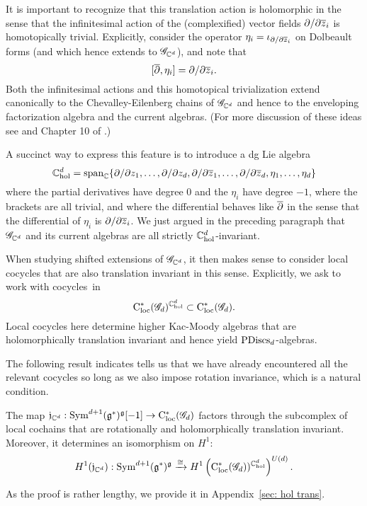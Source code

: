 It is important to recognize that this translation action is holomorphic in the sense that the infinitesimal action of the (complexified) vector fields $\partial/\partial \Bar{z}_i$ is homotopically trivial.
Explicitly, consider the operator $\eta_i = \iota_{\partial/\partial \Bar{z}_i}$ on Dolbeault forms
(and which hence extends to $\sG_{\CC^d}$), and
note that
\[
[\dbar, \eta_i] = \partial/\partial \Bar{z}_i.
\]
Both the infinitesimal actions and this homotopical trivialization extend canonically to the Chevalley-Eilenberg chains of $\sG_{\CC^d}$ and hence to the enveloping factorization algebra and the current algebras.
(For more discussion of these ideas see \cite{BWhol} and Chapter 10 of \cite{CG2}.)

A succinct way to express this feature is to introduce a dg Lie algebra  
\[
\CC^d_{\rm hol} = \text{span}_\CC\{\partial/\partial z_1, \ldots, \partial/\partial z_d, \partial/\partial \Bar{z}_1,\ldots,\partial/\partial \Bar{z}_d, \eta_1,\ldots, \eta_d\}
\]
where the partial derivatives have degree 0 and the $\eta_i$ have degree $-1$,
where the brackets are all trivial, 
and where the differential behaves like $\dbar$ in the sense that the differential of $\eta_i$ is $\partial/\partial \Bar{z}_i$.
We just argued in the preceding paragraph that $\sG_{\CC^d}$ and its current algebras are all strictly $\CC^d_{\rm hol}$-invariant. 

When studying shifted extensions of $\sG_{\CC^d}$, 
it then makes sense to consider local cocycles that are also translation invariant in this sense.
Explicitly, we ask to work with cocycles~in
\[
\cloc^*(\sG_{d})^{\CC^d_{\rm hol}} \subset \cloc^*(\sG_{d}).
\]
Local cocycles here determine higher Kac-Moody algebras that are holomorphically translation invariant and hence yield ${\rm PDiscs}_d$-algebras.

The following result indicates tells us that we have already encountered all the relevant cocycles so long as we also impose rotation invariance, which is a natural condition.

\begin{prop}
\label{prop: trans j}
The map $\fj_{\CC^d} :  \Sym^{d+1}(\fg^*)^\fg [-1] \to \cloc^*(\sG_{d})$ factors through the  subcomplex of local cochains that are rotationally and holomorphically translation invariant.
Moreover, it determines an isomorphism on $H^1$:
\[
H^1(\fj_{\CC^d}) : \Sym^{d+1}(\fg^*)^\fg \xto{\cong} H^1 \left(\cloc^*(\sG_d))^{\CC^{d}_{\rm hol}}\right)^{U(d)} .
\]
\end{prop}

As the proof is rather lengthy, we provide it in Appendix~\ref{sec: hol trans}.

